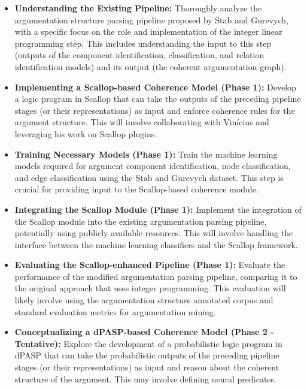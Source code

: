 \documentclass{article}
\begin{document}
\begin{itemize}
    \item \textbf{Understanding the Existing Pipeline:} Thoroughly analyze the
    argumentation structure parsing pipeline proposed by Stab and Gurevych, with
    a specific focus on the role and implementation of the integer linear
    programming step. This includes understanding the input to this step
    (outputs of the component identification, classification, and relation
    identification models) and its output (the coherent argumentation graph).

    \item \textbf{Implementing a Scallop-based Coherence Model (Phase 1):}
    Develop a logic program in Scallop that can take the outputs
    of the preceding pipeline stages (or their representations) as input and
    enforce coherence rules for the argument structure. This will involve
    collaborating with Vinícius and leveraging his work on Scallop plugins.

    \item \textbf{Training Necessary Models (Phase 1):} Train the machine
    learning models required for argument component identification, node
    classification, and edge classification using the Stab and Gurevych
    dataset. This step is crucial for providing input to the Scallop-based
    coherence module.

    \item \textbf{Integrating the Scallop Module (Phase 1):} Implement the
    integration of the Scallop module into the existing argumentation parsing
    pipeline, potentially using publicly available resources. This will involve
    handling the interface between the machine learning classifiers and the
    Scallop framework.

    \item \textbf{Evaluating the Scallop-enhanced Pipeline (Phase 1):} Evaluate
    the performance of the modified argumentation parsing pipeline, comparing it
    to the original approach that uses integer programming. This evaluation
    will likely involve using the argumentation structure annotated corpus and
    standard evaluation metrics for argumentation mining.

    \item \textbf{Conceptualizing a dPASP-based Coherence Model (Phase 2 -
    Tentative):} Explore the development of a probabilistic logic program in
    dPASP that can take the probabilistic outputs of the preceding pipeline
    stages (or their representations) as input and reason about the coherent
    structure of the argument. This may involve defining neural predicates.


\end{itemize}
\end{document}
